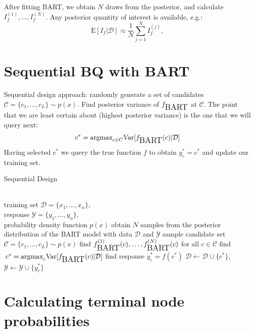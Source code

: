 \documentclass[a0,portrait]{a0poster}
\newcommand{\bart}{\mbox{\tiny BART}}
\begin{document}
\begin{multicols}{3}
After fitting BART, we obtain $N$ draws from the posterior, and calculate $I_f^{(1)}, \ldots, I_f^{(N)}$. Any
posterior quantity of interest is available, e.g.:
\begin{equation}
	\mbox{E}[I_f|\mathcal{D}] \approx \frac{1}{N} \sum_{j=1}^{N} I_f^{(j)},
\end{equation}
\section*{Sequential BQ with BART}
Sequential design approach: randomly generate a set of candidates
$\mathcal{C} = \{c_1, \ldots, c_L\}\sim p(x)$. Find posterior variance of $f_{\bart}$ at $\mathcal{C}$. The point that we are least certain about (highest posterior variance) is the one that we will query next:
\begin{equation}
	c^* = \mbox{argmax}_{c \in C} \mbox{Var}[f_{\bart}(c) |\mathcal{D}]
	\label{eq:maxvariance}
\end{equation}
Having selected $c^*$ we query the true function $f$ to obtain $y_c^* = c^*$ and update our training set.

\begin{algorithm}[H]
  \caption{Sequential Design}
  \label{alg:SQ}
\begin{algorithmic}
  \\training set $\mathcal{D} = \{x_1, \ldots, x_n\}$, \\response $\mathcal{Y} = \{y_1, \ldots, y_n\}$, \\
  probability density function $p(x)$
  \STATE obtain $N$ samples from the posterior distribution of the BART model with data $\mathcal{D}$ and $\mathcal{Y}$
  \STATE sample candidate set $\mathcal{C} = \{c_1, \ldots, c_L\}\sim p(x)$ 
  \STATE find $f_{\bart}^{(1)}(c), \ldots, f_{\bart}^{(N)}(c)$ for all $c\in\mathcal{C}$
  \STATE find $\,c^* = \mbox{argmax}_{c} \mbox{Var}[f_{\bart}(c)|\mathcal{D}]
	\label{eq:maxvar}$
  \STATE find response $y_c^* = f(c^*)$
  \STATE $\mathcal{D} \leftarrow \mathcal{D}\cup \{c^*\}$, $\mathcal{Y} \leftarrow \mathcal{Y}\cup \{y_c^*\}$
  \ENDFOR
\end{algorithmic}
\end{algorithm}
\label{Sequential Design}




\section*{Calculating terminal node probabilities}
\label{p}


\end{multicols}
\end{document}
